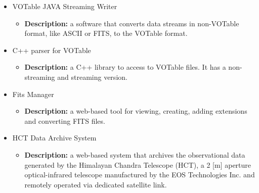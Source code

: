 \begin{itemize}
\begin{itemize}
\begin{itemize}
\item \textbf{Description:} a C\# .NET port of Tom McGlynn's nom.tam.fits JAVA
package\footnote{\url{http://heasarc.gsfc.nasa.gov/docs/heasarc/fits/java/v0.9/javadoc/}}.
\end{itemize}
\item VOTable JAVA Streaming Writer
\begin{itemize}
\item \textbf{Description:} a software that converts data streams in non-VOTable
format, like ASCII or FITS, to the VOTable format.
\end{itemize}
\item C++ parser for VOTable
\begin{itemize}
\item \textbf{Description:} a C++ library to access to VOTable files. It has a
non-streaming and streaming version.
\end{itemize}
\item Fits Manager
\begin{itemize}
\item \textbf{Description:} a web-based tool for viewing, creating, adding
extensions and converting FITS files.
\end{itemize}
\item HCT Data Archive System
\begin{itemize}
\item \textbf{Description:} a web-based system that archives the observational
data generated by the Himalayan Chandra Telescope (HCT), a 2 [m] aperture
optical-infrared telescope manufactured by the EOS Technologies Inc. and
remotely operated via dedicated satellite link.
\end{itemize}
\end{itemize}
\end{itemize}
